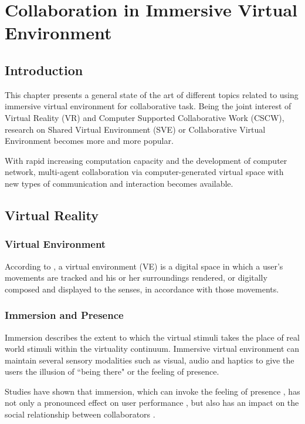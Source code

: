 \chapter{Collaboration in Immersive Virtual Environment}
\label{chapter:context}
\minitoc

\section{Introduction}
This chapter presents a general state of the art of different topics related to using immersive virtual environment for collaborative task. Being the joint interest of Virtual Reality (VR) and Computer Supported Collaborative Work (CSCW), research on Shared Virtual Environment (SVE) or Collaborative Virtual Environment becomes more and more popular.

With rapid increasing computation capacity and the development of computer network, multi-agent collaboration via computer-generated virtual space with new types of communication and interaction becomes available.

\section{Virtual Reality}

\subsection{Virtual Environment}
According to \citet{Fox2009Guide}, a virtual environment (VE) is a digital space in which a user's movements are tracked and his or her surroundings rendered, or digitally composed and displayed to the senses, in accordance with those movements.


\subsection{Immersion and Presence}
Immersion describes the extent to which the virtual stimuli takes the place of real world stimuli within the virtuality continuum.
Immersive virtual environment can maintain several sensory modalities such as visual, audio and haptics to give the users the illusion of ``being there" or the feeling of presence.

Studies have shown that immersion, which can invoke the feeling of presence \citep{Slater1994DepthPre}, has not only a pronounced effect on user performance \citep{Dangelo2008Benefits}, but also has an impact on the social relationship between collaborators \citep{Slater2000Small}.

